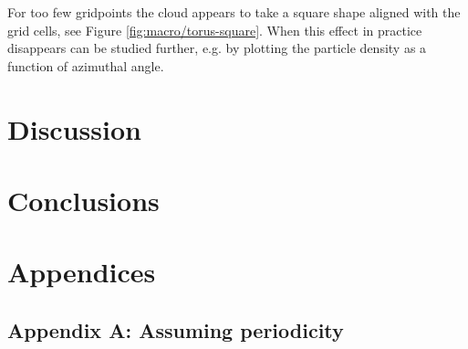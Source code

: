 \documentclass[a4paper,
twoside=false,abstract=false,numbers=noenddot,
titlepage=false,headings=small,parskip=half,version=last]{scrartcl}
\begin{document}
For too few gridpoints the cloud appears to take a square shape aligned with the grid cells, see Figure \ref{fig:macro/torus-square}. When this effect in practice disappears can be studied further, e.g. by plotting the particle density as a function of azimuthal angle.

\section{Discussion}

\section{Conclusions}





\section{Appendices}
\subsection{Appendix A: Assuming periodicity}
\end{document}
